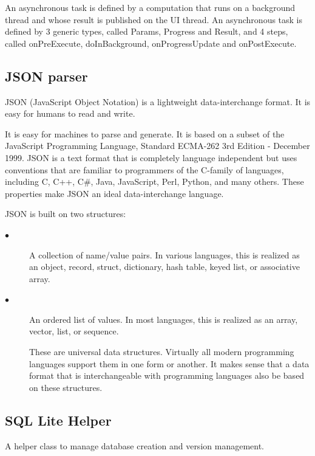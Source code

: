 An asynchronous task is defined by a computation that runs on a background thread and whose result is published on the UI thread. An asynchronous task is defined by 3 generic types, called Params, Progress and Result, and 4 steps, called onPreExecute, doInBackground, onProgressUpdate and onPostExecute.



\subsection{JSON parser}

JSON (JavaScript Object Notation) is a lightweight data-interchange format. It is easy for humans to read and write.

 It is easy for machines to parse and generate. It is based on a subset of the JavaScript Programming Language, Standard ECMA-262 3rd Edition - December 1999. JSON is a text format that is completely language independent but uses conventions that are familiar to programmers of the C-family of languages, including C, C++, C#, Java, JavaScript, Perl, Python, and many others. These properties make JSON an ideal data-interchange language.

JSON is built on two structures:

\begin{description}



   \item[$\bullet$ ]  A collection of name/value pairs. In various languages, this is realized as an object, record, struct, dictionary, hash table, keyed list, or associative array.
   \item[$\bullet$ ]  An ordered list of values. In most languages, this is realized as an array, vector, list, or sequence.

These are universal data structures. Virtually all modern programming languages support them in one form or another. It makes sense that a data format that is interchangeable with programming languages also be based on these structures.



\end{description}
\subsection{SQL Lite Helper}

A helper class to manage database creation and version management.

